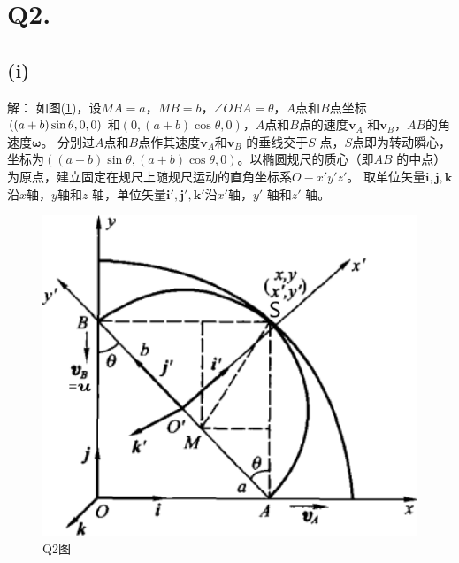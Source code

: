 \documentclass[10pt,a4paper]{article}
\theoremstyle{remark}
\begin{document}
\section*{Q2.}
\subsection*{(i)}解：
如图(\ref{FigureofHomework_2Problem_2})，设$MA = a$，$MB = b$，$\angle OBA = \theta$，$A$点和$B$点坐标$\\((a + b)\sin\theta,0,0)$ 和$(0,(a + b)\cos\theta,0)$，$A$点和$B$点的速度$\bm{v}_A$ 和$\bm{v}_B$，$AB$的角速度$\bm{\omega}$。 分别过$A$点和$B$点作其速度$\bm{v}_A$和$\bm{v}_B$ 的垂线交于$S$ 点，$S$点即为转动瞬心，坐标为$((a + b)\sin\theta,(a + b)\cos\theta,0)$。以椭圆规尺的质心（即$AB$ 的中点）为原点，建立固定在规尺上随规尺运动的直角坐标系$O-x'y'z'$。 取单位矢量$\bm{i},\bm{j},\bm{k}$沿$x$轴，$y$轴和$z$ 轴，单位矢量$\bm{i}',\bm{j}',\bm{k}'$沿$x'$轴，$y'$ 轴和$z'$ 轴。
\begin{figure}[h]
\centering
\includegraphics[scale=.5]{FigureofHomework_2Problem_2.png}
\caption{Q2图}\label{FigureofHomework_2Problem_2}
\end{figure}
\end{document}
